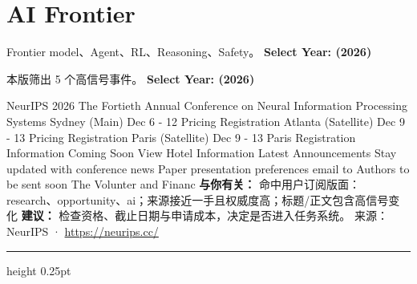 \documentclass[10.5pt]{ctexart}
\begin{document}
\section*{AI Frontier}
{\color{ormuted} Frontier model、Agent、RL、Reasoning、Safety。}
\vspace{2mm}
{\LARGE\bfseries Select Year: (2026)}\par
\vspace{1mm}
{\color{ormuted} 本版筛出 5 个高信号事件。}
\vspace{3mm}
{\Large\bfseries Select Year: (2026)}\par
NeurIPS 2026 The Fortieth Annual Conference on Neural Information Processing Systems Sydney (Main) Dec 6 - 12 Pricing Registration Atlanta (Satellite) Dec 9 - 13 Pricing Registration Paris (Satellite) Dec 9 - 13 Paris Registration Information Coming Soon View Hotel Information Latest Announcements Stay updated with conference news Paper presentation preferences email to Authors to be sent soon The Volunter and Financ
\textbf{与你有关：} 命中用户订阅版面：research、opportunity、ai；来源接近一手且权威度高；标题/正文包含高信号变化
\textbf{建议：} 检查资格、截止日期与申请成本，决定是否进入任务系统。
{\footnotesize\color{ormuted} 来源：NeurIPS · \url{https://neurips.cc/}}
\vspace{4mm}
\hrule height 0.25pt
\vspace{3mm}
\end{document}
